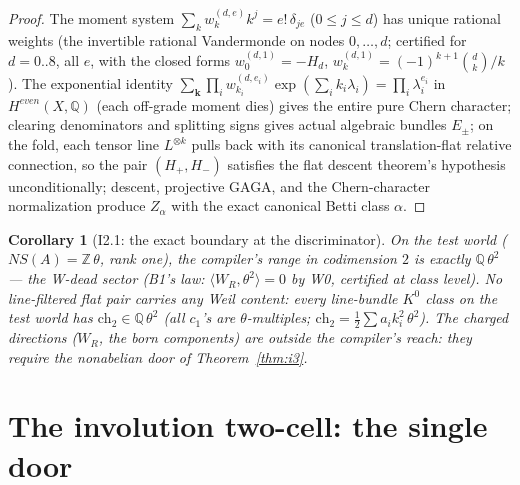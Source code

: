 \documentclass[11pt]{article}
\newtheorem{corollary}[theorem]{Corollary}
\begin{document}
\begin{proof}
The moment system $\sum_k w^{(d,e)}_k k^j=e!\,\delta_{je}$ ($0\le j\le d$) has unique
rational weights (the invertible rational Vandermonde on nodes $0,\dots,d$; certified
for $d=0..8$, all $e$, with the closed forms $w^{(d,1)}_0=-H_d$,
$w^{(d,1)}_k=(-1)^{k+1}\binom dk/k$). The exponential identity
$\sum_{\mathbf k}\prod_i w^{(d,e_i)}_{k_i}\exp(\sum_i k_i\lambda_i)=\prod_i\lambda_i^{e_i}$
in $H^{even}(X,\mathbb Q)$ (each off-grade moment dies) gives the entire pure Chern
character; clearing denominators and splitting signs gives actual algebraic bundles
$E_\pm$; on the fold, each tensor line $L^{\otimes k}$ pulls back with its canonical
translation-flat relative connection, so the pair $(H_+,H_-)$ satisfies the flat descent
theorem's hypothesis unconditionally; descent, projective GAGA, and the Chern-character
normalization produce $Z_\alpha$ with the exact canonical Betti class $\alpha$.
\end{proof}

\begin{corollary}[I2.1: the exact boundary at the discriminator]\label{cor:i21}
On the test world ($NS(A)=\mathbb Z\,\theta$, rank one), the compiler's range in
codimension $2$ is exactly $\mathbb Q\,\theta^2$ --- the W-dead sector (B1's law:
$\langle W_R,\theta^2\rangle=0$ by W0, certified at class level). No line-filtered
flat pair carries any Weil content: every line-bundle $K^0$ class on the test world
has $\mathrm{ch}_2\in\mathbb Q\,\theta^2$ (all $c_1$'s are $\theta$-multiples;
$\mathrm{ch}_2=\frac12\sum a_ik_i^2\,\theta^2$). The charged directions
($W_R$, the born components) are outside the compiler's reach: they require the
nonabelian door of Theorem~\ref{thm:i3}.
\end{corollary}

\section{The involution two-cell: the single door}
\end{document}
